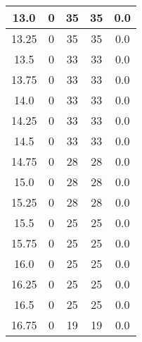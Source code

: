 \documentclass[letterpaper, 12pt]{article}
\begin{document}
\begin{longtable}{|c|c|c|c|c|}
\hline
13.0 & 0 & 35 & 35 & 0.0 \\
\hline
13.25 & 0 & 35 & 35 & 0.0 \\
\hline
13.5 & 0 & 33 & 33 & 0.0 \\
\hline
13.75 & 0 & 33 & 33 & 0.0 \\
\hline
14.0 & 0 & 33 & 33 & 0.0 \\
\hline
14.25 & 0 & 33 & 33 & 0.0 \\
\hline
14.5 & 0 & 33 & 33 & 0.0 \\
\hline
14.75 & 0 & 28 & 28 & 0.0 \\
\hline
15.0 & 0 & 28 & 28 & 0.0 \\
\hline
15.25 & 0 & 28 & 28 & 0.0 \\
\hline
15.5 & 0 & 25 & 25 & 0.0 \\
\hline
15.75 & 0 & 25 & 25 & 0.0 \\
\hline
16.0 & 0 & 25 & 25 & 0.0 \\
\hline
16.25 & 0 & 25 & 25 & 0.0 \\
\hline
16.5 & 0 & 25 & 25 & 0.0 \\
\hline
16.75 & 0 & 19 & 19 & 0.0 \\
\hline
\end{longtable}
\end{document}
